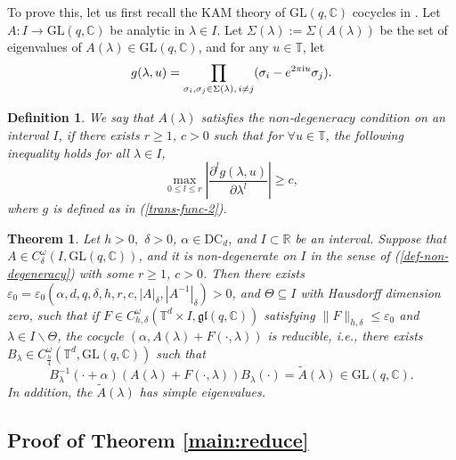 \documentclass[reqno,11pt]{amsart}
\newtheorem{theorem}{Theorem}[section]
\newtheorem{definition}{Definition}[section]
\newcommand{\C}{{\mathbb C}}
\newcommand{\R}{{\mathbb R}}
\newcommand{\T}{{\mathbb T}}
\def\GL{{\mathrm{GL}}}
\def\ii{{\textrm i}}
\begin{document}
To prove this, let us first recall the KAM theory of $\GL(q,\C)$ cocycles in \cite{WXYZ}.
 Let $A: I\rightarrow \GL(q,\C)$ be analytic in $\lambda\in I$.
Let $\Sigma(\lambda):=\Sigma(A(\lambda))$ be the set of eigenvalues of $A(\lambda)\in \GL(q,\C)$, and for any $u\in\T$, let
\begin{equation}\label{trans-func-2}
g(\lambda,u)=\prod_{\sigma_i,\sigma_j\in \Sigma(\lambda),\, {i\neq j}}(\sigma_i-e^{2\pi \ii u}\sigma_j).
\end{equation}
\begin{definition}
We say that $A(\lambda)$ satisfies the $non$-$degeneracy$ condition on an interval $I$, if there exists {$r\geq1$}, $c>0$ such that for $\forall u\in\T$, the following inequality holds for all $\lambda\in I$,
\begin{equation}\label{def-non-degeneracy}
\max_{0\leq l\leq r}|\frac{\partial^{l}g(\lambda,u)}{\partial\lambda^{l}}|\geq c,
\end{equation}
where $g$ is defined as in (\ref{trans-func-2}).
\end{definition}

 \begin{theorem}\cite{WXYZ}\label{Thm2}
Let $h>0,$ $\delta>0$, $\alpha\in\mathrm{DC}_{d}$, and $I\subset\R$ be an interval. 
Suppose that $A\in C_{\delta}^{\omega}(I,\mathrm{GL}(q,\C))$, and  it is non-degenerate on $I$ in the sense of (\ref{def-non-degeneracy}) with some {$r\geq1$}, $c>0$. 
Then there exists $\varepsilon_{0}=\varepsilon_0(\alpha,d,q,\delta,h,r,c,|A|_\delta,|A^{-1}|_\delta)>0$, and $\Theta\subseteq I$ with Hausdorff dimension zero, such that  if $F\in C^{\omega}_{h,\delta}(\T^{d}\times I,\mathfrak{gl}(q,\C))$ satisfying $\|F\|_{h,\delta}\leq\varepsilon_{0}$ and   $\lambda\in I\backslash\Theta$, the cocycle $(\alpha,  A(\lambda)+F(\cdot, \lambda))$ is reducible, i.e., there exists $B_{\lambda}\in C_{\frac{h}{4}}^{\omega}(\T^{d},\GL(q,\C))$ such that
$$
B_\lambda^{-1}(\cdot+\alpha)(A(\lambda)+F(\cdot, \lambda))B_\lambda(\cdot)=\tilde{A}(\lambda)\in \mathrm{GL}(q,\C).
$$
In addition, the $\tilde{A}(\lambda)$ has simple eigenvalues.
\end{theorem}


\subsection*{Proof of Theorem \ref{main:reduce}}
\end{document}
